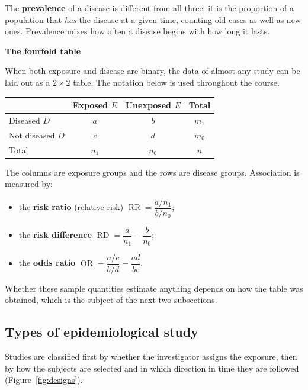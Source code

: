 \documentclass[11pt,a4paper]{article}
\numberwithin{equation}{section}
\DeclareMathOperator{\OR}{OR}
\DeclareMathOperator{\RR}{RR}
\DeclareMathOperator{\RD}{RD}
\theoremstyle{definition}
\newcommand{\subhead}[1]{%
  \par\medskip\noindent\textbf{#1}\par\nobreak\smallskip}
\begin{document}
The \textbf{prevalence} of a disease is different from all three: it is the proportion of a population that \emph{has} the disease at a
given time, counting old cases as well as new ones. Prevalence mixes how often a disease begins with how long it lasts.

\subhead{The fourfold table}

When both exposure and disease are binary, the data of almost any study can be laid out as a $2 \times 2$ table. The notation below is
used throughout the course.
\begin{center}
\begin{tabular}{l|cc|c}
 & Exposed $E$ & Unexposed $\bar E$ & Total \\
\hline
Diseased $D$ & $a$ & $b$ & $m_1$ \\
Not diseased $\bar D$ & $c$ & $d$ & $m_0$ \\
\hline
Total & $n_1$ & $n_0$ & $n$ \\
\end{tabular}
\end{center}
The columns are exposure groups and the rows are disease groups. Association is measured by:
\begin{itemize}
\item the \textbf{risk ratio} (relative risk) $\RR = \dfrac{a/n_1}{b/n_0}$;
\item the \textbf{risk difference} $\RD = \dfrac{a}{n_1} - \dfrac{b}{n_0}$;
\item the \textbf{odds ratio} $\OR = \dfrac{a/c}{b/d} = \dfrac{ad}{bc}$.
\end{itemize}
Whether these sample quantities estimate anything depends on how the table was obtained, which is the subject of the next two subsections.

\subsection{Types of epidemiological study}
\label{sec:designs}

Studies are classified first by whether the investigator assigns the exposure, then by how the subjects are selected and in which
direction in time they are followed (Figure~\ref{fig:designs}).
\end{document}
